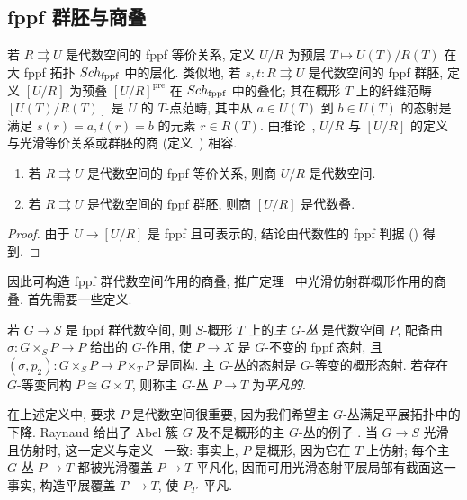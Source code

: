 \subsection{fppf 群胚与商叠}\label{src:7.3.2-subsection}
若 $R\rightrightarrows U$ 是代数空间的 fppf 等价关系, 定义 $U/R$ 为预层 $T\mapsto U(T)/R(T)$ 在大 fppf 拓扑 $Sch_{\mathrm{fppf}}$ 中的层化. 类似地, 若 $s,t:R\rightrightarrows U$ 是代数空间的 fppf 群胚, 定义 $[U/R]$ 为预叠 $[U/R]^{\mathrm{pre}}$ 在 $Sch_{\mathrm{fppf}}$ 中的叠化; 其在概形 $T$ 上的纤维范畴 $[U(T)/R(T)]$ 是 $U$ 的 $T$-点范畴, 其中从 $a\in U(T)$ 到 $b\in U(T)$ 的态射是满足 $s(r)=a,t(r)=b$ 的元素 $r\in R(T)$. 由推论~, $U/R$ 与 $[U/R]$ 的定义与光滑等价关系或群胚的商 (定义~) 相容.
\begin{corollary}\label{src:7.3.6}
\begin{enumerate}[(1)]
\item 若 $R\rightrightarrows U$ 是代数空间的 fppf 等价关系, 则商 $U/R$ 是代数空间.
\item 若 $R\rightrightarrows U$ 是代数空间的 fppf 群胚, 则商 $[U/R]$ 是代数叠.
\end{enumerate}
\end{corollary}
\begin{proof}
由于 $U\to[U/R]$ 是 fppf 且可表示的, 结论由代数性的 fppf 判据 () 得到.
\end{proof}
因此可构造 fppf 群代数空间作用的商叠, 推广定理~ 中光滑仿射群概形作用的商叠. 首先需要一些定义.
\begin{definition}[主 \texorpdfstring{$G$}{G}-丛]\label{src:7.3.7}
若 $G\to S$ 是 fppf 群代数空间, 则 $S$-概形 $T$ 上的\emph{主 $G$-丛} 是代数空间 $P$, 配备由 $\sigma:G\times_S P\to P$ 给出的 $G$-作用, 使 $P\to X$ 是 $G$-不变的 fppf 态射, 且 $(\sigma,p_2):G\times_S P\to P\times_T P$ 是同构. 主 $G$-丛的态射是 $G$-等变的概形态射. 若存在 $G$-等变同构 $P\cong G\times T$, 则称主 $G$-丛 $P\to T$ 为\emph{平凡的}.
\end{definition}
在上述定义中, 要求 $P$ 是代数空间很重要, 因为我们希望主 $G$-丛满足平展拓扑中的下降. Raynaud 给出了 Abel 簇 $G$ 及不是概形的主 $G$-丛的例子 \cite[XIII 3.2]{Ray70}. 当 $G\to S$ 光滑且仿射时, 这一定义与定义~ 一致: 事实上, $P$ 是概形, 因为它在 $T$ 上仿射; 每个主 $G$-丛 $P\to T$ 都被光滑覆盖 $P\to T$ 平凡化, 因而可用光滑态射平展局部有截面这一事实, 构造平展覆盖 $T'\to T$, 使 $P_{T'}$ 平凡.
